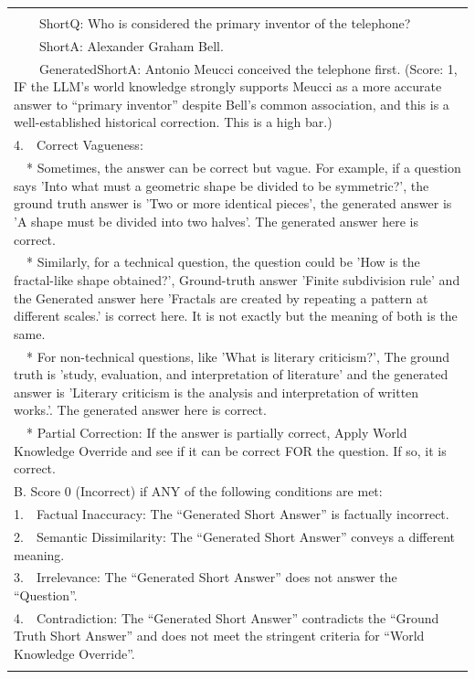 \documentclass[11pt]{article}
\begin{document}
\begin{table}[t]
\begin{tabular}{@{}p{\textwidth}@{}}
{\ \ Example:\\
\ \ \ \ ShortQ: Who is considered the primary inventor of the telephone?\\
\ \ \ \ ShortA: Alexander Graham Bell.\\
\ \ \ \ GeneratedShortA: Antonio Meucci conceived the telephone first. (Score: 1, IF the LLM's world knowledge strongly supports Meucci as a more accurate answer to ``primary inventor'' despite Bell's common association, and this is a well-established historical correction. This is a high bar.)\\
4.\ \ Correct Vagueness:\\
\ \ * Sometimes, the answer can be correct but vague. For example, if a question says 'Into what must a geometric shape be divided to be symmetric?', the ground truth answer is 'Two or more identical pieces', the generated answer is 'A shape must be divided into two halves'. The generated answer here is correct.\\
\ \ * Similarly, for a technical question, the question could be 'How is the fractal-like shape obtained?', Ground-truth answer 'Finite subdivision rule' and the Generated answer here 'Fractals are created by repeating a pattern at different scales.' is correct here. It is not exactly but the meaning of both is the same.\\
\ \ * For non-technical questions, like 'What is literary criticism?', The ground truth is 'study, evaluation, and interpretation of literature' and the generated answer is 'Literary criticism is the analysis and interpretation of written works.'. The generated answer here is correct. \ \ \ \ \ \ \ \ \ \ \ \ \ \ \ \ \ \ \ \ \ \ \ \\
\ \ * Partial Correction: If the answer is partially correct, Apply World Knowledge Override and see if it can be correct FOR the question. If so, it is correct.\\
B. Score 0 (Incorrect) if ANY of the following conditions are met:\\
1.\ \ Factual Inaccuracy: The ``Generated Short Answer'' is factually incorrect.\\
2.\ \ Semantic Dissimilarity: The ``Generated Short Answer'' conveys a different meaning.\\
3.\ \ Irrelevance: The ``Generated Short Answer'' does not answer the ``Question''.\\
4.\ \ Contradiction: The ``Generated Short Answer'' contradicts the ``Ground Truth Short Answer'' and does not meet the stringent criteria for ``World Knowledge Override''.\\
}
\end{tabular}
\end{table}
\end{document}
